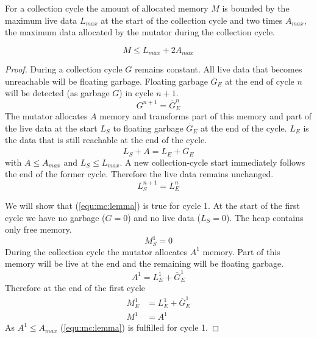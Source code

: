 \begin{lemma}

For a collection cycle the amount of allocated memory $M$ is bounded
by the maximum live data $L_{max}$ at the start of the collection
cycle and two times $A_{max}$, the maximum data allocated by the
mutator during the collection cycle.

\begin{equation}\label{equ:mc:lemma}
    M \le L_{max} + 2 A_{max}
\end{equation}

\end{lemma}

\begin{proof}

During a collection cycle $G$ remains constant. All live data that
becomes unreachable will be floating garbage. Floating garbage
$\overline{G}_E$ at the end of cycle $n$ will be detected (as
garbage $G$) in cycle $n+1$.
%
\begin{equation}\label{equ:flg}
    G^{n+1} = \overline{G}_E^n
\end{equation}
%
The mutator allocates $A$ memory and transforms part of this memory
and part of the live data at the start $L_S$ to floating garbage
$\overline{G}_E$ at the end of the cycle. $L_E$ is the data that is
still reachable at the end of the cycle.
%
\begin{equation}\label{equ:trans}
    L_S + A = L_E + \overline{G}_E
\end{equation}
%
with $A \le A_{max}$ and $L_S \le L_{max}$. A new collection-cycle
start immediately follows the end of the former cycle. Therefore the
live data remains unchanged.
%
\begin{equation}\label{equ:ldata}
    L_S^{n+1} = L_E^{n}
\end{equation}

We will show that (\ref{equ:mc:lemma}) is true for cycle 1. At the
start of the first cycle we have no garbage ($G=0$) and no live data
($L_S=0$). The heap contains only free memory.
%
\begin{equation}\label{equ:mc:start}
    M_S^1 = 0
\end{equation}
%
During the collection cycle the mutator allocates $A^1$ memory. Part
of this memory will be live at the end and the remaining will be
floating garbage.
%
\begin{equation}\label{equ:mc:cyc1:A}
    A^1 = L_E^1 + \overline{G}_E^1
\end{equation}
%
Therefore at the end of the first cycle
%
\begin{align}
\nonumber
    M_E^1 & = L_E^1 + \overline{G}_E^1\\
    M^1   & = A^1
\end{align}
%
As $A^1 \le A_{max}$ (\ref{equ:mc:lemma}) is fulfilled for cycle 1.


\end{proof}
